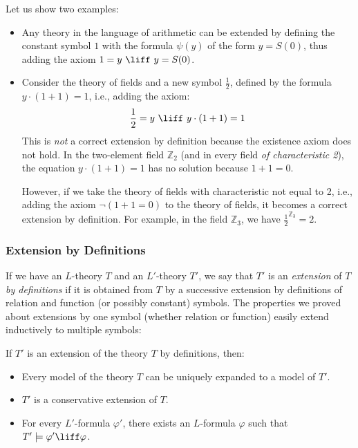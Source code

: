 \begin{example}
    Let us show two examples:
    \begin{itemize}
        \item Any theory in the language of arithmetic can be extended by defining the constant symbol $1$ with the formula $\psi(y)$ of the form $y=S(0)$, thus adding the axiom $1=y\ \liff\ y=S(0)$.
        \item Consider the theory of fields and a new symbol $\frac{1}{2}$, defined by the formula $y\cdot (1+1)=1$, i.e., adding the axiom:
        $$
        \frac{1}{2}=y\ \liff\ y\cdot (1+1)=1
        $$
        This is \emph{not} a correct extension by definition because the existence axiom does not hold. In the two-element field $\mathbb Z_2$ (and in every field \emph{of characteristic 2}), the equation $y\cdot (1+1)=1$ has no solution because $1+1=0$.
        
        
        However, if we take the theory of fields with characteristic not equal to 2, i.e., adding the axiom $\neg (1+1=0)$ to the theory of fields, it becomes a correct extension by definition. For example, in the field $\mathbb Z_3$, we have $\frac{1}{2}^{\mathbb Z_3}=2$.
    \end{itemize}
\end{example}


\subsubsection*{Extension by Definitions}

If we have an $L$-theory $T$ and an $L'$-theory $T'$, we say that $T'$ is an \emph{extension} of $T$ \emph{by definitions} if it is obtained from $T$ by a successive extension by definitions of relation and function (or possibly constant) symbols. The properties we proved about extensions by one symbol (whether relation or function) easily extend inductively to multiple symbols:

\begin{corollary}
   If $T'$ is an extension of the theory $T$ by definitions, then:
   \begin{itemize}
    \item Every model of the theory $T$ can be uniquely expanded to a model of $T'$.
    \item $T'$ is a conservative extension of $T$.
    \item For every $L'$-formula $\varphi'$, there exists an $L$-formula $\varphi$ such that $T'\models\varphi'\liff\varphi$.
   \end{itemize}
\end{corollary}

